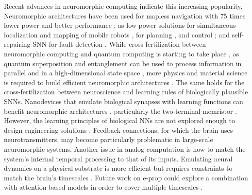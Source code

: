     Recent advances in neuromorphic computing indicate this increasing popularity.
    Neuromorphic architectures have been used for mapless navigation with 75 times lower power and better performance \citep{tang2020reinforcement}; as low-power solutions for simultaneous localization and mapping of mobile robots \citep{tang2019spiking}, for planning \citep{fischl2017path}, and control \citep{blum2017neuromorphic}; and self-repairing SNN for fault detection \citep{zhu2017target}.
    While cross-fertilization between neuromorphic computing and quantum computing is starting to take place \citep{russek2016stochastic}, as quantum superposition and entanglement can be used to process information in parallel and in a high-dimensional state space \citep{fujii2017harnessing, yamamoto2017coherent,tacchino2019artificial}, more physics and material science is required to build efficient neuromorphic architectures \citep{markovic2020physics}.
    The same holds for the cross-fertilization between neuroscience and learning rules of biologically plausible SNNs.
    Nanodevices that emulate biological synapses with learning functions can benefit neuromorphic architectures \citep{yao2017face,wang2018photonic,ren2018analytical}, particularly the two-terminal memristor \citep{jo2010nanoscale,wang2017memristors}.
    However, the learning principles of biological NNs are not explored enough to design engineering solutions \citep{gorban2019unreasonable,taherkhani2018supervised}.
    Feedback connections, for which the brain uses neurotransmitters, may become particularly problematic in large-scale neuromorphic systems.
    Another issue in analog computation is how to match the system's internal temporal processing to that of its inputs.
    Emulating neural dynamics on a physical substrate is more efficient but requires constraints to match the brain's timescales \citep{mead1990neuromorphic,jaeger2021dimensions}.
    Future work on e-prop could explore a combination with attention-based models in order to cover multiple timescales \citep{bellec2020solution}.
